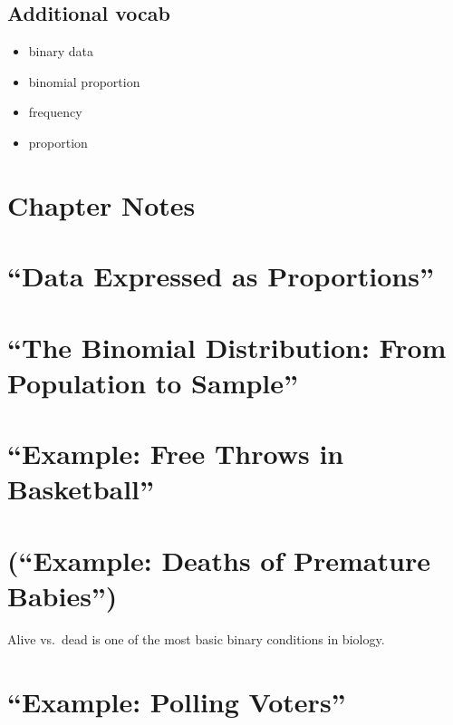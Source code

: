 \documentclass[]{book}
\providecommand{\tightlist}{%
  \setlength{\itemsep}{0pt}\setlength{\parskip}{0pt}}
\theoremstyle{definition}
\theoremstyle{definition}
\theoremstyle{definition}
\theoremstyle{remark}
\begin{document}
\subsection*{Additional vocab}\label{additional-vocab-1}

\begin{itemize}
\tightlist
\item
  binary data
\item
  binomial proportion
\item
  frequency
\item
  proportion
\end{itemize}

\section*{Chapter Notes}\label{chapter-notes-3}

\section{\texorpdfstring{``Data Expressed as
Proportions''}{Data Expressed as Proportions}}\label{data-expressed-as-proportions}

\section{\texorpdfstring{``The Binomial Distribution: From Population to
Sample''}{The Binomial Distribution: From Population to Sample}}\label{the-binomial-distribution-from-population-to-sample}

\section{\texorpdfstring{``Example: Free Throws in
Basketball''}{Example: Free Throws in Basketball}}\label{example-free-throws-in-basketball}

\section{\texorpdfstring{(``Example: Deaths of Premature
Babies'')}{(Example: Deaths of Premature Babies)}}\label{example-deaths-of-premature-babies}

Alive vs.~dead is one of the most basic binary conditions in biology.

\section{\texorpdfstring{``Example: Polling
Voters''}{Example: Polling Voters}}\label{example-polling-voters}
\end{document}

